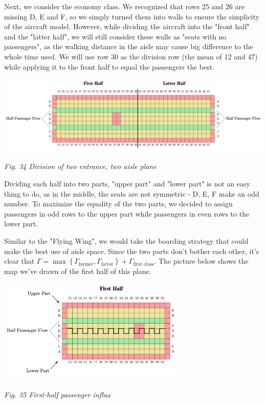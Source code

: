 \documentclass{article}
\theoremstyle{definition}
\theoremstyle{remark}
\numberwithin{equation}{section}
\begin{document}
	Next, we consider the economy class. We recognized that rows 25 and 26 are missing D, E and F, so we simply turned them into walls to ensure the simplicity of the aircraft model. However, while dividing the aircraft into the "front half" and the "latter half", we will still consider these walls as "seats with no passengers", as the walking distance in the aisle may cause big difference to the whole time used. We will use row 30 as the division row (the mean of 12 and 47) while applying it to the front half to equal the passengers the best.

	\begin{center}
		\includegraphics[width=14cm]{whole.jpg}

		\small \textit{Fig. 34 Division of two entrance, two aisle plane}
	\end{center}

	Dividing each half into two parts, "upper part" and "lower part" is not an easy thing to do, as in the middle, the seats are not symmetric - D, E, F make an odd number. To maximize the equality of the two parts, we decided to assign passengers in odd rows to the upper part while passengers in even rows to the lower part.

	Similar to the "Flying Wing", we would take the boarding strategy that could make the best use of aisle space. Since the two parts don't bother each other, it's clear that $\Gamma=\max \left\{\Gamma_\text{former}, \Gamma_\text{latter}\right\}+\Gamma_{\text{first class}}$. The picture below shows the map we've drawn of the first half of this plane.

	\begin{center}
		\includegraphics[height = 5cm]{fsthlf.jpg}

		\small\textit{Fig. 35 First-half passenger influx}
	\end{center}
\end{document}
